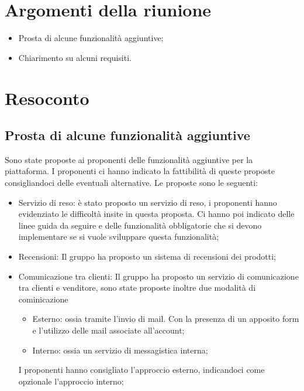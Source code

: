 \documentclass[a4paper]{article}
\begin{document}
    \section{Argomenti della riunione}
    \begin{itemize}
        \item Prosta di alcune funzionalità aggiuntive;
        \item Chiarimento su alcuni requisiti.
    \end{itemize}
    \section{Resoconto}
    
        \subsection{Prosta di alcune funzionalità aggiuntive}
        Sono state proposte ai proponenti delle funzionalità aggiuntive per la piattaforma. I proponenti ci hanno indicato la fattibilità di queste proposte consigliandoci delle eventuali alternative.
        Le proposte sono le seguenti:
        \begin{itemize}
            \item Servizio di reso: è stato proposto un servizio di reso, i proponenti hanno evidenziato le difficoltà insite in questa proposta. Ci hanno poi indicato delle linee guida da seguire e delle funzionalità obbligatorie che si devono implementare se si vuole sviluppare questa funzionalità;
            \item Recensioni: Il gruppo ha proposto un sistema di recensioni dei prodotti;
            \item Comunicazione tra clienti: Il gruppo ha proposto un servizio di comunicazione tra clienti e venditore, sono state proposte inoltre due modalità di cominicazione
            \begin{itemize}
                \item Esterno: ossia tramite l'invio di mail. Con la presenza di un apposito form e l'utilizzo delle mail associate all'account;
                \item Interno: ossia un servizio di messagistica interna;  
            \end{itemize}
            I proponenti hanno consigliato l'approccio esterno, indicandoci come opzionale l'approccio interno;
        \end{itemize}
        
\end{document}
